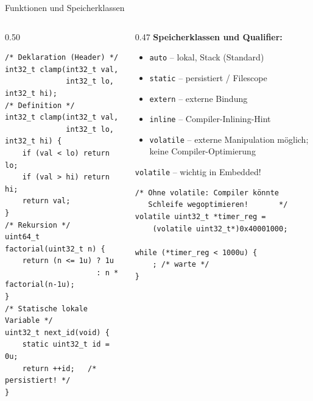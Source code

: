 \documentclass[%
  aspectratio=169,
  10pt
]{beamer}
\begin{document}
\begin{frame}[fragile]{Funktionen und Speicherklassen}
  \begin{columns}[T]
    \begin{column}{0.50\textwidth}
\begin{lstlisting}
/* Deklaration (Header) */
int32_t clamp(int32_t val,
              int32_t lo, int32_t hi);
/* Definition */
int32_t clamp(int32_t val,
              int32_t lo, int32_t hi) {
    if (val < lo) return lo;
    if (val > hi) return hi;
    return val;
}
/* Rekursion */
uint64_t factorial(uint32_t n) {
    return (n <= 1u) ? 1u
                     : n * factorial(n-1u);
}
/* Statische lokale Variable */
uint32_t next_id(void) {
    static uint32_t id = 0u;
    return ++id;   /* persistiert! */
}
\end{lstlisting}
    \end{column}
    \begin{column}{0.47\textwidth}
      \textbf{Speicherklassen und Qualifier:}
      \begin{itemize}
        \item \texttt{auto} -- lokal, Stack (Standard)
        \item \texttt{static} -- persistiert / Filescope
        \item \texttt{extern} -- externe Bindung
        \item \texttt{inline} -- Compiler-Inlining-Hint
        \item \texttt{volatile} -- externe Manipulation möglich; keine Compiler-Optimierung
      \end{itemize}
      \vspace{0.3em}
      \begin{alertblock}{\texttt{volatile} -- wichtig in Embedded!}
\begin{lstlisting}
/* Ohne volatile: Compiler könnte
   Schleife wegoptimieren!       */
volatile uint32_t *timer_reg =
    (volatile uint32_t*)0x40001000;

while (*timer_reg < 1000u) {
    ; /* warte */
}
\end{lstlisting}
      \end{alertblock}
    \end{column}
  \end{columns}
\end{frame}
\end{document}
